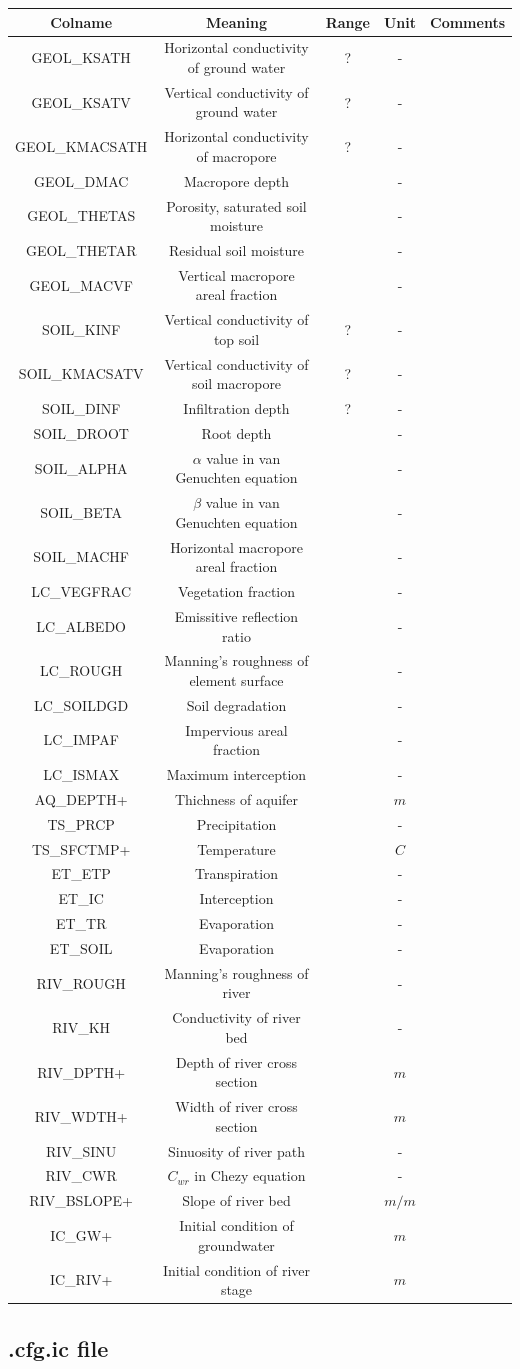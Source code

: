 \documentclass[]{scrbook}
\begin{document}
\begin{longtable}[]{@{}ccccc@{}}
\toprule
Colname & Meaning & Range & Unit & Comments\tabularnewline
\midrule
\endhead
GEOL\_KSATH & Horizontal conductivity of ground water & ? & -
&\tabularnewline
GEOL\_KSATV & Vertical conductivity of ground water & ? & -
&\tabularnewline
GEOL\_KMACSATH & Horizontal conductivity of macropore & ? & -
&\tabularnewline
GEOL\_DMAC & Macropore depth & & - &\tabularnewline
GEOL\_THETAS & Porosity, saturated soil moisture & & - &\tabularnewline
GEOL\_THETAR & Residual soil moisture & & - &\tabularnewline
GEOL\_MACVF & Vertical macropore areal fraction & & - &\tabularnewline
SOIL\_KINF & Vertical conductivity of top soil & ? & - &\tabularnewline
SOIL\_KMACSATV & Vertical conductivity of soil macropore & ? & -
&\tabularnewline
SOIL\_DINF & Infiltration depth & ? & - &\tabularnewline
SOIL\_DROOT & Root depth & & - &\tabularnewline
SOIL\_ALPHA & \(\alpha\) value in van Genuchten equation & & -
&\tabularnewline
SOIL\_BETA & \(\beta\) value in van Genuchten equation & & -
&\tabularnewline
SOIL\_MACHF & Horizontal macropore areal fraction & & - &\tabularnewline
LC\_VEGFRAC & Vegetation fraction & & - &\tabularnewline
LC\_ALBEDO & Emissitive reflection ratio & & - &\tabularnewline
LC\_ROUGH & Manning's roughness of element surface & & -
&\tabularnewline
LC\_SOILDGD & Soil degradation & & - &\tabularnewline
LC\_IMPAF & Impervious areal fraction & & - &\tabularnewline
LC\_ISMAX & Maximum interception & & - &\tabularnewline
AQ\_DEPTH+ & Thichness of aquifer & & \(m\) &\tabularnewline
TS\_PRCP & Precipitation & & - &\tabularnewline
TS\_SFCTMP+ & Temperature & & \(C\) &\tabularnewline
ET\_ETP & Transpiration & & - &\tabularnewline
ET\_IC & Interception & & - &\tabularnewline
ET\_TR & Evaporation & & - &\tabularnewline
ET\_SOIL & Evaporation & & - &\tabularnewline
RIV\_ROUGH & Manning's roughness of river & & - &\tabularnewline
RIV\_KH & Conductivity of river bed & & - &\tabularnewline
RIV\_DPTH+ & Depth of river cross section & & \(m\) &\tabularnewline
RIV\_WDTH+ & Width of river cross section & & \(m\) &\tabularnewline
RIV\_SINU & Sinuosity of river path & & - &\tabularnewline
RIV\_CWR & \(C_{wr}\) in Chezy equation & & - &\tabularnewline
RIV\_BSLOPE+ & Slope of river bed & & \(m/m\) &\tabularnewline
IC\_GW+ & Initial condition of groundwater & & \(m\) &\tabularnewline
IC\_RIV+ & Initial condition of river stage & & \(m\) &\tabularnewline
\bottomrule
\end{longtable}

\subsection{.cfg.ic file}\label{cfg.ic-file}
\end{document}
